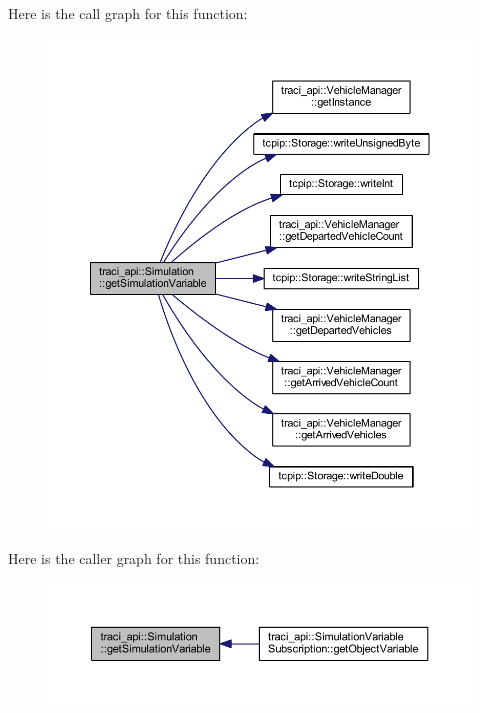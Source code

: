 Here is the call graph for this function\+:\nopagebreak
\begin{figure}[H]
\begin{center}
\leavevmode
\includegraphics[width=350pt]{classtraci__api_1_1_simulation_aa7ebe041dd0f34ccef7f2f2293775c3b_cgraph}
\end{center}
\end{figure}
Here is the caller graph for this function\+:\nopagebreak
\begin{figure}[H]
\begin{center}
\leavevmode
\includegraphics[width=350pt]{classtraci__api_1_1_simulation_aa7ebe041dd0f34ccef7f2f2293775c3b_icgraph}
\end{center}
\end{figure}
\mbox{\label{classtraci__api_1_1_simulation_a413eac30f40f25fabbd94cc6ff16a51c}} 
